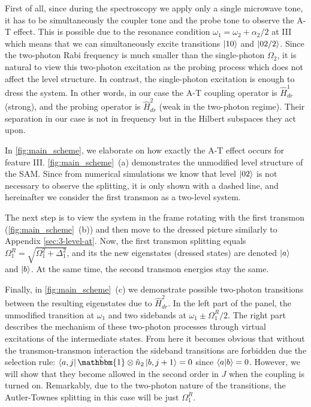 \documentclass[%
 aip,
 amsmath,amssymb,
 reprint,%
]{revtex4-1}
\begin{document}
First of all, since during the spectroscopy we apply only a single microwave tone, it has to be simultaneously the coupler tone and the probe tone to observe the A-T effect. This is possible due to the resonance condition $\omega_1 = \omega_2+\alpha_2/2$ at III which means that we can simultaneously excite transitions $\ket{10}$ and $\ket{02/2}$. Since the two-photon Rabi frequency is much smaller than the single-photon $\Omega_2$, it is natural to view this two-photon excitation as the probing process which does not affect the level structure. In contrast, the single-photon excitation is enough to dress the system. In other words, in our case the A-T coupling operator is $\hat H_{dr}^1$ (strong), and the probing operator is $\hat H_{dr}^2$ (weak in the two-photon regime). Their separation in our case is not in frequency but in the Hilbert subspaces they act upon.

In \autoref{fig:main_scheme}, we elaborate on how exactly the A-T effect occurs for feature III. \autoref{fig:main_scheme}~(a) demonstrates the unmodified level structure of the SAM. Since from numerical simulations we know that level $\ket{02}$ is not necessary to observe the splitting, it is only shown with a dashed line, and hereinafter we consider the first transmon as a two-level system.

The next step is to view the system in the frame rotating with the first transmon (\autoref{fig:main_scheme}~(b)) and then move to the  dressed picture similarly to Appendix \ref{sec:3-level-at}. Now, the first transmon splitting equals $\Omega_{1}^R = \sqrt{\Omega_1^2+\Delta_1^2}$, and its the new eigenstates (dressed states) are denoted $\ket{a}$ and $\ket{b}$. At the same time, the second transmon energies stay the same.


Finally, in \autoref{fig:main_scheme}~(c) we demonstrate possible two-photon transitions between the resulting eigenstates due to $\hat H_{dr}^2$. In the left part of the panel, the unmodified transition at $\omega_1$ and two sidebands at $\omega_1 \pm \Omega_1^R/2$. The right part describes the mechanism of these two-photon processes through virtual excitations of the intermediate states. From here it becomes obvious that without the transmon-transmon interaction the sideband transitions are forbidden due the selection rule: $\bra{a,j}\hat{\mathbbm{1}}\otimes \hat n_2 \ket{b, j+1} = 0$ since $\braket{a}{b} = 0$. However, we will show that they become allowed in the second order in $J$ when the coupling is turned on.  Remarkably, due to the two-photon nature of the transitions, the Autler-Townes splitting in this case will be just $\Omega_1^R$.
\end{document}
